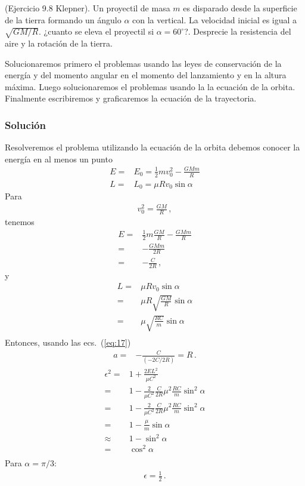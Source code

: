 \ejemplo{}
 (Ejercicio 9.8 Klepner). Un proyectil de masa $m$ es disparado desde la superficie de la tierra formando un ángulo $\alpha$ con la vertical. La velocidad inicial es igual a $\sqrt{GM/R}$. ¿cuanto se eleva el proyectil si $\alpha=60^\circ$?. Desprecie la resistencia del aire y la rotación de la tierra. 

Solucionaremos primero el problemas usando las leyes de conservación de la energía y del momento angular en el momento del lanzamiento y en la altura máxima. Luego solucionaremos el problemas usando la la ecuación de la orbita. Finalmente escribiremos y graficaremos la ecuación de la trayectoria.

\subsubsection*{Solución}
Resolveremos el problema utilizando la ecuación de la orbita debemos conocer la energía en al menos un punto
\begin{align}
  E=&E_0=\frac{1}{2}m v_0^2-\frac{GMm}{R}\nonumber\\
  L=&L_0=\mu R v_0 \sin\alpha
\end{align}
Para
\begin{align}
  v_0^2=\frac{GM}{R}\,,
\end{align}
tenemos
\begin{align}
    E=&\frac{1}{2}m\frac{GM}{R} -\frac{GMm}{R}\nonumber\\
    =&-\frac{GMm}{2R}\nonumber\\
   =&-\frac{C}{2R}\,,
\end{align}
y
\begin{align}
  L=&\mu R v_0 \sin\alpha\nonumber\\
  =&\mu R\sqrt{\frac{GM}{R}}\sin\alpha\nonumber\\
  =&\mu \sqrt{\frac{RC}{m}}\sin\alpha\nonumber\\
\end{align}
Entonces, usando las ecs.~(\ref{eq:17})
\begin{align}
\label{eq:24}
  a=&-\frac{C}{(-2C/2R)}=R\,.
\end{align}
\begin{align}
  \epsilon^2=&1+\frac{2EL^2}{\mu C^2}\nonumber\\
  =&1-\frac{2}{\mu C^2}\frac{C}{2R}\mu^2\frac{RC}{m}\sin^2\alpha\nonumber\\
  =&1-\frac{2}{\mu C^2}\frac{C}{2R}\mu^2\frac{RC}{m}\sin^2\alpha\nonumber\\
  =&1-\frac{\mu}{m}\sin\alpha\nonumber\\
  \approx&1-\sin^2\alpha\nonumber\\
  =&\cos^2\alpha\nonumber\\
\end{align}
Para $\alpha=\pi/3$:
\begin{align}
\label{eq:25}
\epsilon=\frac{1}{2}\,.
\end{align}

